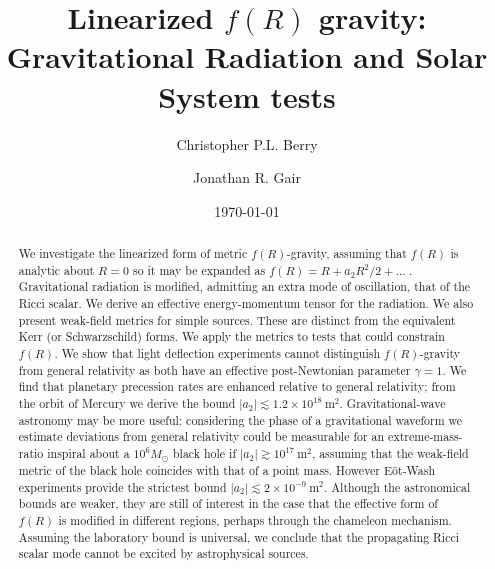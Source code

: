 \documentclass[aps,prd,amsfonts,amssymb,amsmath,nofootinbib,reprint,showpacs]{revtex4-1}
\newcommand{\units}[1]{\ensuremath{~\mathrm{#1}}}
\begin{document}

\title{Linearized $f(R)$ gravity: Gravitational Radiation and Solar System tests}

\author{Christopher P.L. Berry}
\author{Jonathan R. Gair}

\date{\today}

\begin{abstract}
We investigate the linearized form of metric $f(R)$-gravity, assuming that $f(R)$ is analytic about $R = 0$ so it may be expanded as $f(R) = R + a_2R^2/2 + \ldots\;$. Gravitational radiation is modified, admitting an extra mode of oscillation, that of the Ricci scalar. We derive an effective energy-momentum tensor for the radiation. We also present weak-field metrics for simple sources. These are distinct from the equivalent Kerr (or Schwarzschild) forms. We apply the metrics to tests that could constrain $f(R)$. We show that light deflection experiments cannot distinguish $f(R)$-gravity from general relativity as both have an effective post-Newtonian parameter $\gamma = 1$. We find that planetary precession rates are enhanced relative to general relativity; from the orbit of Mercury we derive the bound $|a_2| \lesssim 1.2 \times 10^{18}\units{m^2}$. Gravitational-wave astronomy may be more useful: considering the phase of a gravitational waveform we estimate deviations from general relativity could be measurable for an extreme-mass-ratio inspiral about a $10^6 M_\odot$ black hole if $|a_2| \gtrsim 10^{17}\units{m^2}$, assuming that the weak-field metric of the black hole coincides with that of a point mass. However E\"ot-Wash experiments provide the strictest bound $|a_2| \lesssim 2 \times 10^{-9}\units{m^2}$. Although the astronomical bounds are weaker, they are still of interest in the case that the effective form of $f(R)$ is modified in different regions, perhaps through the chameleon mechanism. Assuming the laboratory bound is universal, we conclude that the propagating Ricci scalar mode cannot be excited by astrophysical sources.
\end{abstract}


\maketitle
\end{document}
